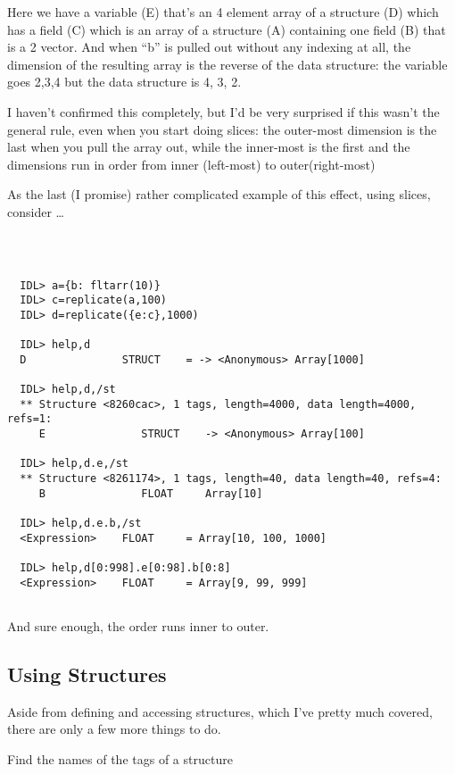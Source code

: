 Here we have a variable (E) that's an 4 element array of a structure (D)
which has a field (C) which is an array of a structure (A) containing
one field (B) that is a 2 vector. And when ``b'' is pulled out without
any indexing at all, the dimension of the resulting array is the
reverse of the data structure: the variable goes 2,3,4 but the data
structure is 4, 3, 2.

I haven't confirmed this completely, but I'd be very surprised if this
wasn't the general rule, even when you start doing slices: the
outer-most dimension is the last when you pull the array out, while
the inner-most is the first and the dimensions run in order from inner
(left-most) to outer(right-most)

As the last (I promise) rather complicated example of this effect,
using slices, consider \ldots


\begin{IDLExample}\begin{verbatim}



  IDL> a={b: fltarr(10)}
  IDL> c=replicate(a,100)
  IDL> d=replicate({e:c},1000)

  IDL> help,d
  D               STRUCT    = -> <Anonymous> Array[1000]

  IDL> help,d,/st
  ** Structure <8260cac>, 1 tags, length=4000, data length=4000, refs=1:
     E               STRUCT    -> <Anonymous> Array[100]

  IDL> help,d.e,/st
  ** Structure <8261174>, 1 tags, length=40, data length=40, refs=4:
     B               FLOAT     Array[10]

  IDL> help,d.e.b,/st
  <Expression>    FLOAT     = Array[10, 100, 1000]

  IDL> help,d[0:998].e[0:98].b[0:8]
  <Expression>    FLOAT     = Array[9, 99, 999]


\end{verbatim}\end{IDLExample}


And sure enough, the order runs inner to outer.



\newpage
\subsection{Using Structures}
Aside from defining and accessing structures, which I've pretty much
covered, there are only a few more things to do.

\be
  \item Find the names of the tags of a structure

